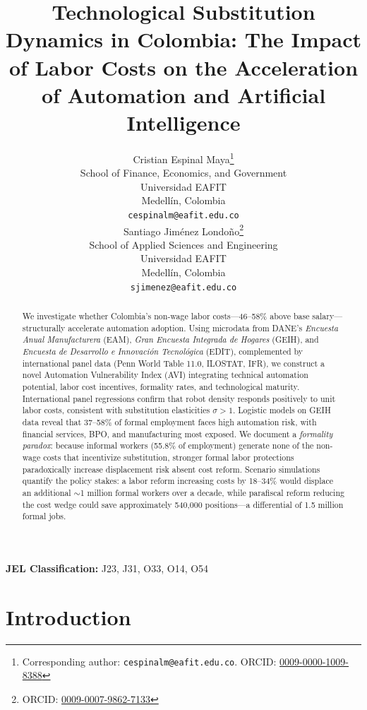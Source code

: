 \documentclass{article}
\title{Technological Substitution Dynamics in Colombia: The Impact of Labor Costs on the Acceleration of Automation and Artificial Intelligence}
\author{
 Cristian Espinal Maya\thanks{Corresponding author: \texttt{cespinalm@eafit.edu.co}. ORCID: \href{https://orcid.org/0009-0000-1009-8388}{0009-0000-1009-8388}} \\
  School of Finance, Economics, and Government\\
  Universidad EAFIT\\
  Medell\'in, Colombia \\
  \texttt{cespinalm@eafit.edu.co} \\
  \And
 Santiago Jim\'enez Londo\~no\thanks{ORCID: \href{https://orcid.org/0009-0007-9862-7133}{0009-0007-9862-7133}} \\
  School of Applied Sciences and Engineering\\
  Universidad EAFIT\\
  Medell\'in, Colombia \\
  \texttt{sjimenez@eafit.edu.co} \\
}
\begin{document}
\maketitle

\begin{abstract}
We investigate whether Colombia's non-wage labor costs---46--58\% above base salary---structurally accelerate automation adoption. Using microdata from DANE's \textit{Encuesta Anual Manufacturera} (EAM), \textit{Gran Encuesta Integrada de Hogares} (GEIH), and \textit{Encuesta de Desarrollo e Innovaci\'on Tecnol\'ogica} (EDIT), complemented by international panel data (Penn World Table 11.0, ILOSTAT, IFR), we construct a novel Automation Vulnerability Index (AVI) integrating technical automation potential, labor cost incentives, formality rates, and technological maturity. International panel regressions confirm that robot density responds positively to unit labor costs, consistent with substitution elasticities $\sigma > 1$. Logistic models on GEIH data reveal that 37--58\% of formal employment faces high automation risk, with financial services, BPO, and manufacturing most exposed. We document a \textit{formality paradox}: because informal workers (55.8\% of employment) generate none of the non-wage costs that incentivize substitution, stronger formal labor protections paradoxically increase displacement risk absent cost reform. Scenario simulations quantify the policy stakes: a labor reform increasing costs by 18--34\% would displace an additional $\sim$1 million formal workers over a decade, while parafiscal reform reducing the cost wedge could save approximately 540,000 positions---a differential of 1.5 million formal jobs.
\end{abstract}


\noindent\textbf{JEL Classification:} J23, J31, O33, O14, O54

\FloatBarrier
\section{Introduction}
\label{sec:introduction}
\end{document}
